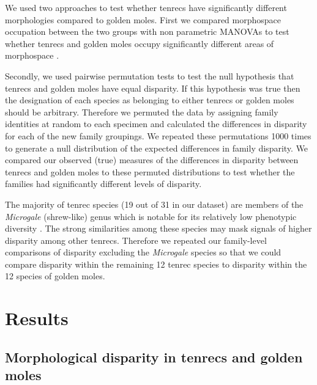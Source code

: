 \documentclass[12pt,a4paper]{article}
\begin{document}
	We used two approaches to test whether tenrecs have significantly different morphologies compared to golden moles. First we compared morphospace occupation between the two groups with non parametric MANOVAs \citep{Anderson2001} to test whether tenrecs and golden moles occupy significantly different areas of morphospace \citep[e.g][]{Serb2011, Ruta2013}.
	 
	Secondly, we used pairwise permutation tests to test the null hypothesis that tenrecs and golden moles have equal disparity. If this hypothesis was true then the designation of each species as belonging to either tenrecs or golden moles should be arbitrary. Therefore we permuted the data by assigning family identities at random to each specimen and calculated the differences in disparity for each of the new family groupings. We repeated these permutations 1000 times to generate a null distribution of the expected differences in family disparity. We compared our observed (true) measures of the differences in disparity between tenrecs and golden moles to these permuted distributions to test whether the families had significantly different levels of disparity.

	The majority of tenrec species (19 out of 31 in our dataset) are members of the \textit{Microgale} (shrew-like) genus which is notable for its relatively low phenotypic diversity \citep{Soarimalala2011, Jenkins2003}. The strong similarities among these species may mask signals of higher disparity among other tenrecs. Therefore we repeated our family-level comparisons of disparity excluding the \textit{Microgale} species so that we could compare disparity within the remaining 12 tenrec species to disparity within the 12 species of golden moles.


\section{Results}


\subsection{Morphological disparity in tenrecs and golden moles} 
 
\end{document}

